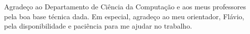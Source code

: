 Agradeço ao Departamento de Ciência da Computação e aos meus professores
pela boa base técnica dada. Em especial, agradeço ao meu orientador,
Flávio, pela disponibilidade e paciência para me ajudar no trabalho.
